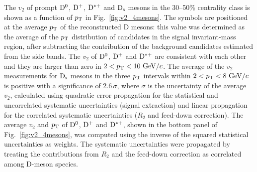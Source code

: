 \fi
The $v_2$ of prompt ${\rm D^0}$, ${\rm D^+}$, ${\rm D^{*+}}$ and ${\rm D_s}$ mesons in
the 30--50\% centrality class is shown as a function of $p_{\rm T}$ in Fig.~\ref{fig:v2_4mesons}.
The symbols are positioned at the average $p_{\rm T}$ of the 
reconstructed D mesons: this value was determined as the 
average of the $p_{\rm T}$ distribution of candidates in the signal invariant-mass region, 
after subtracting the contribution of the background 
candidates estimated from the side bands.
The $v_2$ of ${\rm D^0}$, ${\rm D^+}$ and ${\rm D^{*+}}$ are consistent 
with each other and they are larger than zero in $2<p_{\rm T}<10~\mathrm{GeV}/c$.
The average of the $v_2$ measurements for ${\rm D_s}$ mesons in
 the three $p_{\rm T}$ intervals within $2<p_{\rm T}<8~\mathrm{GeV}/c$ is 
 positive with a significance of 2.6\,$\sigma$,
where $\sigma$ is the uncertainty of the average $v_2$, 
calculated using quadratic error propagation for the
 statistical and uncorrelated systematic uncertainties 
(signal extraction) and linear propagation for the correlated 
systematic uncertainties ($R_2$ and feed-down correction).
The average $v_2$ and $p_{\rm T}$ of ${\rm D^0}$, ${\rm D^+}$ and 
${\rm D^{*+}}$, shown in the bottom panel of Fig.~\ref{fig:v2_4mesons}, was 
computed using the inverse of the squared statistical uncertainties as weights. 
The systematic uncertainties were propagated by
treating the contributions from $R_2$
and the feed-down correction as correlated among D-meson species. 
